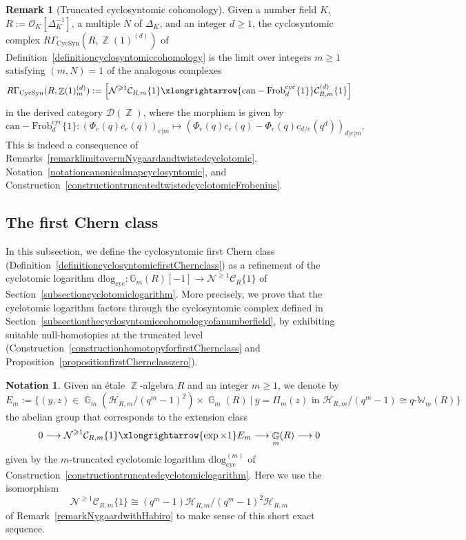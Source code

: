 \documentclass[10pt,twoside]{scrarticle}
\newlength{\mar} \setlength{\mar}{1cm}%
\newlength{\len}
\theoremstyle{definition}
\newtheorem{remark}[theorem]{Remark}
\newtheorem{notation}[theorem]{Notation}
\DeclareMathOperator{\Z}{\mathbb{Z}}
\DeclareMathOperator{\G}{\mathbb{G}}
\newcommand{\can}{\text{can}}
\newcommand{\CRm}{\mathcal{C}_{R,m}}
\newcommand{\Frob}{\mathrm{Frob}}
\newcommand{\Cyc}{\mathrm{cyc}}
\newcommand{\CycSyn}{\mathrm{CycSyn}}
\newcommand{\qWm}{q\text{-}\mathbb{W}_m}
\renewcommand{\ge}{\geqslant}
\newcommand{\dlog}{\mathrm{dlog}}
\numberwithin{equation}{theorem}
\begin{document}
\begin{remark}[Truncated cyclosyntomic cohomology]\label{remarktruncatedcyclosyntomiccohomology}
    Given a number field $K$, $R:=\mathcal{O}_K[\Delta_K^{-1}]$, a multiple $N$ of $\Delta_K$, and an integer $d \ge 1$, the cyclosyntomic complex $R\Gamma_{\CycSyn}(R,\Z(1)^{(d)})$ of Definition~\ref{definitioncyclosyntomiccohomology} is the limit over integers $m \ge 1$ satisfying $(m,N)=1$ of the analogous complexes
    $$R\Gamma_{\CycSyn}(R,\Z(1)^{(d)}_m) := \left[ \mathcal{N}^{\ge 1} \mathcal{C}_{R,m}\{1\} \xlongrightarrow{\can - \Frob^{\Cyc}_d\{1\}} \mathcal{C}_{R,m}^{(d)}\{1\} \right]$$
    in the derived category $\mathcal{D}(\Z)$, where the morphism is given by $$\can - \Frob_d^{\Cyc}\{1\} : (\Phi_e(q)c_e(q))_{e|m} \mapsto (\Phi_e(q)c_e(q) - \Phi_e(q)c_{d/e}(q^d))_{d|e|m}.$$ This is indeed a consequence of Remarks~\ref{remarklimitovermNygaardandtwistedcyclotomic}, Notation~\ref{notationcanonicalmapcyclosyntomic}, and Construction~\ref{constructiontruncatedtwistedcyclotomicFrobenius}.
\end{remark}


\subsection{The first Chern class}\label{subsec:the-first-chern-class}

In this subsection, we define the cyclosyntomic first Chern class (Definition~\ref{definitioncyclosyntomicfirstChernclass}) as a refinement of the cyclotomic logarithm $\dlog_{\Cyc} :\mathbb{G}_m(R)[-1]\to \mathcal{N}^{\ge 1} \mathcal{C}_{R}\{1\}$
of Section~\ref{subsectioncyclotomiclogarithm}. More precisely, we prove that the cyclotomic logarithm factors through the cyclosyntomic complex defined in Section~\ref{subsectionthecyclosyntomiccohomologyofanumberfield}, by exhibiting suitable null-homotopies at the truncated level (Construction~\ref{constructionhomotopyforfirstChernclass} and Proposition~\ref{propositionfirstChernclasszero}).

\begin{notation}\label{notationextensionclassEm}
    Given an étale $\Z$-algebra $R$ and an integer $m \ge 1$, we denote by
    $$E_m := \big\{(y,z) \in \G_m(\mathcal{H}_{R,m}/(q^m-1)^2) \times \G_m(R)~\big \vert~\overline{y} = \Pi_m(z) \text{ in } \mathcal{H}_{R,m}/(q^m-1) \cong \qWm(R)\big\}$$
    the abelian group that corresponds to the extension class
    $$0 \longrightarrow \mathcal{N}^{\ge 1} \CRm\{1\} \xlongrightarrow{\exp \times 1} E_m \longrightarrow \G_m(R) \longrightarrow 0$$
    given by the $m$-truncated cyclotomic logarithm $\dlog_{\Cyc}^{(m)}$ of Construction~\ref{constructiontruncatedcyclotomiclogarithm}. Here we use the isomorphism
    $$\mathcal{N}^{\ge 1} \CRm\{1\}\cong (q^m-1)\mathcal{H}_{R,m}/(q^m-1)^2\mathcal{H}_{R,m}$$ of Remark~\ref{remarkNygaardwithHabiro} to make sense of this short exact sequence.
\end{notation}
\end{document}
